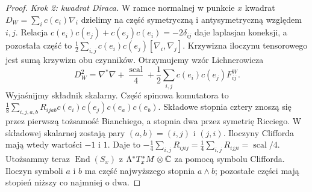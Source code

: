 \begin{proof}
\emph{Krok 2: kwadrat Diraca.}
W ramce normalnej w punkcie $x$ kwadrat
$D_W=\sum_i c(e_i)\nabla_i$ dzielimy na część symetryczną
i antysymetryczną względem $i,j$.
Relacja $c(e_i)c(e_j)+c(e_j)c(e_i)=-2\delta_{ij}$
daje laplasjan koneksji, a pozostała część to
$\frac12\sum_{i,j}c(e_i)c(e_j)[\nabla_i,\nabla_j]$.
Krzywizna iloczynu tensorowego jest sumą krzywizn obu czynników.
Otrzymujemy wzór Lichnerowicza
\[
 D_W^2=\nabla^*\nabla+\frac{\operatorname{scal}}4
          +\frac12\sum_{i,j}c(e_i)c(e_j)F^W_{ij}.
\]
Wyjaśnijmy składnik skalarny.
Część spinowa komutatora to
$\frac18\sum_{i,j,a,b}R_{ijab}c(e_i)c(e_j)c(e_a)c(e_b)$.
Składowe stopnia cztery znoszą się przez pierwszą tożsamość
Bianchiego, a stopnia dwa przez symetrię Ricciego.
W składowej skalarnej zostają pary $(a,b)=(i,j)$ i $(j,i)$.
Iloczyny Clifforda mają wtedy wartości $-1$ i $1$.
Daje to
$-\frac14\sum_{i,j}R_{ijij}
=\frac14\sum_{i,j}R_{ijji}=\operatorname{scal}/4$.
Utożsammy teraz \(\operatorname{End}(S_x)\)
z \(\Lambda^*T_x^*M\otimes\mathbb{C}\) za pomocą
symbolu Clifforda. Iloczyn symboli \(a\) i \(b\)
ma część najwyższego stopnia \(a\wedge b\);
pozostałe części mają stopień niższy co najmniej
o dwa.


\end{proof}
